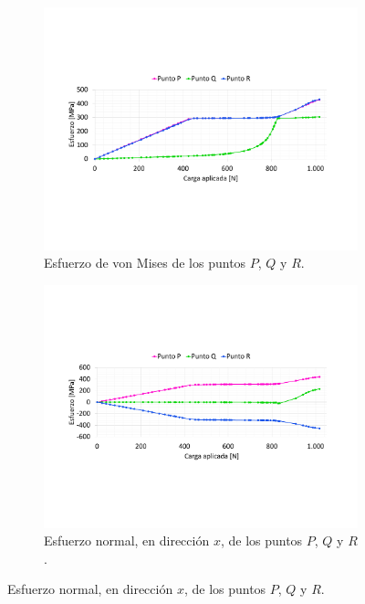 \begin{figure}[h]
\centering
	\begin{subfigure}{1\linewidth}
		\centering
		\includegraphics[width=\linewidth, trim={2cm 5cm 2cm 5cm},clip]{Imagenes/esfpqr_vm.pdf}
		\caption{Esfuerzo de von Mises de los puntos $P$, $Q$ y $R$.}
		\label{fig:esfpqr_vm}
	\end{subfigure}
	\begin{subfigure}{1\linewidth}
		\centering
		\includegraphics[width=\linewidth, trim={2cm 5cm 2cm 5cm},clip]{Imagenes/esfpqr_normal.pdf}
		\caption{Esfuerzo normal, en dirección $x$, de los puntos $P$, $Q$ y $R$.}
		\label{fig:defpqr_vmt}
	\end{subfigure}

\end{figure}
